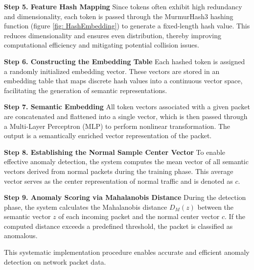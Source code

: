 \begin{ZhChapter}
\textbf{Step 5. Feature Hash Mapping}
Since tokens often exhibit high redundancy and dimensionality, each token is passed through the MurmurHash3 hashing function (figure \ref{fig: HashEmbedding}) to generate a fixed-length hash value. This reduces dimensionality and ensures even distribution, thereby improving computational efficiency and mitigating potential collision issues.

\textbf{Step 6. Constructing the Embedding Table}
Each hashed token is assigned a randomly initialized embedding vector. These vectors are stored in an embedding table that maps discrete hash values into a continuous vector space, facilitating the generation of semantic representations.

\textbf{Step 7. Semantic Embedding}
All token vectors associated with a given packet are concatenated and flattened into a single vector, which is then passed through a Multi-Layer Perceptron (MLP) to perform nonlinear transformation. The output is a semantically enriched vector representation of the packet.

\textbf{Step 8. Establishing the Normal Sample Center Vector}
To enable effective anomaly detection, the system computes the mean vector of all semantic vectors derived from normal packets during the training phase. This average vector serves as the center representation of normal traffic and is denoted as $c$.

\textbf{Step 9. Anomaly Scoring via Mahalanobis Distance}
During the detection phase, the system calculates the Mahalanobis distance $D_M(z)$ between the semantic vector $z$ of each incoming packet and the normal center vector $c$. If the computed distance exceeds a predefined threshold, the packet is classified as anomalous.

This systematic implementation procedure enables accurate and efficient anomaly detection on network packet data.


\end{ZhChapter}